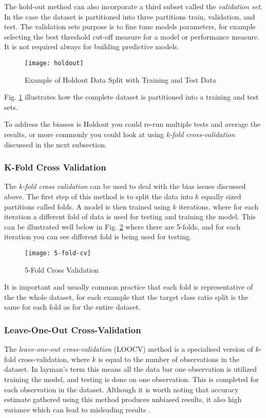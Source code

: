 The hold-out method can also incorporate a third subset called the \textit{validation set}. In the case the dataset is partitioned into three partitions train, validation, and test. The validation sets purpose is to fine tune models parameters, for example selecting the best threshold cut-off measure for a model or performance measure. It is not required always for building predictive models. 

\begin{figure}[H]
	\texttt{[image: holdout]}
	\caption{Example of Holdout Data Split with Training and Test Data}
	\label{fig:holdout}
\end{figure}

Fig. \ref{fig:holdout} illustrates how the complete dataset is partitioned into a training and test sets. 




To address the biasses is Holdout you could re-run multiple tests and average the results, or more commonly you could look at using \textit{k-fold cross-validation} discussed in the next subsection.

\subsubsection{K-Fold Cross Validation}\label{subsec:k_fold}
The \textit{k-fold cross validation} can be used to deal with the bias issues discussed above. The first step of this method is to split the data into $k$ equally sized partitions called folds. A model is then trained using $k$ iterations, where for each iteration a different fold of data is used for testing and training the model. This can be illustrated well below in Fig. \ref{fig:5-fold-cv} where there are 5-folds, and for each iteration you can see different fold is being used for testing.  

\begin{figure}[H]
	\texttt{[image: 5-fold-cv]}
	\caption{5-Fold Cross Validation}
	\label{fig:5-fold-cv}
\end{figure}

It is important and usually common practice that each fold is representative of the the whole dataset, for each example that the target class ratio split is the same for each fold as for the entire dataset. 

\subsubsection{Leave-One-Out Cross-Validation}
The \textit{leave-one-out cross-validation} (LOOCV) method is a specialised version of $k$-fold cross-validation, where $k$ is equal to the number of observations in the dataset. In layman's term this means all the data bar one observation is utilized training the model, and testing is done on one observation. This is completed for each observation in the dataset. Although it is worth noting that accuracy estimate gathered using this method produces unbiased results, it also high variance which can lead to misleading results \citep{refaeilzadeh_cross-validation_2009}.
 

